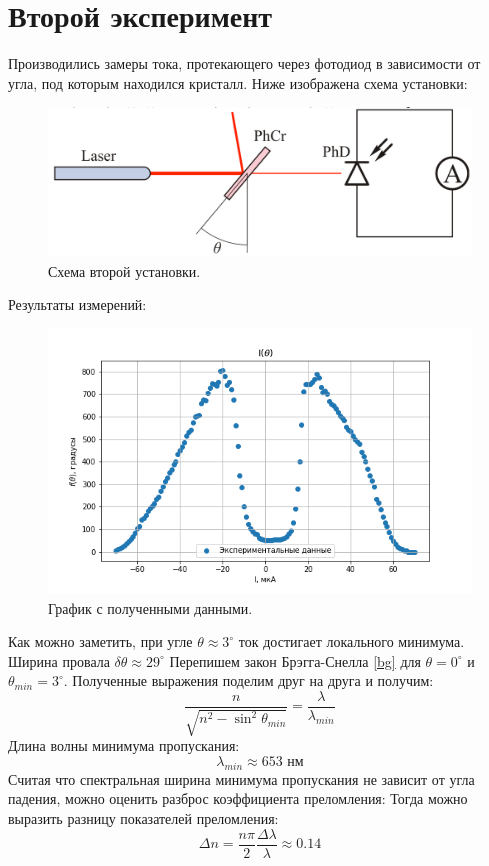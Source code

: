 \documentclass[a4paper, 12pt]{article}
\begin{document}
	\section*{Второй эксперимент}
	Производились замеры тока, протекающего через фотодиод в зависимости от угла, под которым находился кристалл. Ниже изображена схема установки:
		\begin{figure}[H]
		\centering
		\includegraphics[width=0.9\linewidth]{Sch2.png}
		\caption{Схема второй установки.}
		\label{fig:6}
	\end{figure}
	Результаты измерений:
	\begin{figure}[H]
		\centering
		\includegraphics[width=0.85\linewidth]{Graph3.png}
		\caption{График с полученными данными.}
		\label{fig:7}
	\end{figure}
	Как можно заметить, при угле $\theta \approx 3^{\circ}$ ток достигает локального минимума. Ширина провала $\delta\theta \approx  29^{\circ}$
	Перепишем закон Брэгга-Снелла \ref{bg} для $\theta = 0^{\circ}$ и $\theta_{min} = 3^{\circ}$. Полученные выражения поделим друг на друга и получим:
	\begin{equation*}
		\frac{n}{\sqrt{n^{2}-\sin^{2}{\theta_{min}}}} = \frac{\lambda}{\lambda_{min}} 
	\end{equation*}
	Длина волны минимума пропускания:
	\begin{equation*}
		\lambda_{min} \approx 653 \text{ нм}
	\end{equation*}
	Считая что спектральная ширина минимума пропускания не зависит от угла падения, можно оценить разброс коэффициента преломления:
	Тогда можно выразить разницу показателей преломления:
	\begin{equation*}
	\Delta n = \frac{n\pi}{2} \frac{\Delta \lambda}{\lambda} \approx 0.14
	\end{equation*}
\end{document}
